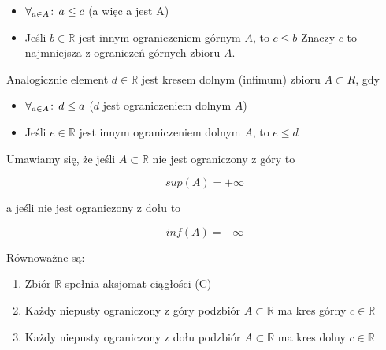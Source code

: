 \documentclass[9pt]{article}
\begin{document}
\begin{itemize}
    \item $\forall_{a \in A} \! : \, a \le c$ (a więc a jest A)
    \item Jeśli $b \in \mathbb{R}$ jest innym ograniczeniem górnym $A$, to $ c \le b$ Znaczy $c$ to
        najmniejsza z ograniczeń górnych zbioru $A$.
\end{itemize}

Analogicznie element $d \in \mathbb{R}$ jest kresem dolnym (infimum) zbioru $A \subset R$, gdy 

\begin{itemize}
    \item $\forall_{a \in A} \! : \, d \le a$ ($d$ jest ograniczeniem dolnym $A$)
    \item Jeśli $e \in \mathbb{R}$ jest innym ograniczeniem dolnym $A$, to $e \le d$
\end{itemize}

Umawiamy się, że jeśli $A \subset \mathbb{R}$ nie jest ograniczony z góry to 

\[
    sup(A) = +\infty
\]

a jeśli nie jest ograniczony z dołu to 

\[
    inf(A) = -\infty
\]

\begin{Twi}
    Równoważne są:
    \begin{enumerate}
        \item Zbiór $\mathbb{R}$ spełnia aksjomat ciągłości (C)
        \item Każdy niepusty ograniczony z góry podzbiór $A \subset \mathbb{R}$ ma kres górny $c \in
            \mathbb{R}$
        \item Każdy niepusty ograniczony z dołu podzbiór $A \subset \mathbb{R}$ ma kres dolny $c \in
            \mathbb{R}$
    \end{enumerate}
\end{Twi}
\end{document}
